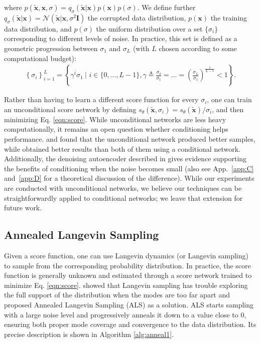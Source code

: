 \documentclass{article} \usepackage{iclr2021_conference_notitle,times}
\theoremstyle{definition}
\theoremstyle{definition}
\begin{document}
where $p(\boldsymbol{\tilde{x}}, \boldsymbol{x}, \sigma) = q_\sigma(\boldsymbol{\tilde{x}} | \boldsymbol{x})p(\boldsymbol{x})p(\sigma)$. We define further  $q_{\sigma}(\boldsymbol{\tilde{x}}|\boldsymbol{x}) = \mathcal{N}(\boldsymbol{\tilde{x}} | {\boldsymbol{x}},\sigma^2 \boldsymbol{I})$ the corrupted data distribution, $p(\boldsymbol{x})$ the training data distribution, and $p(\sigma)$ the uniform distribution over a set $\{\sigma_i\}$ corresponding to different levels of noise.
In practice, this set is defined as a geometric progression between $\sigma_1$ and $\sigma_L$ (with $L$ chosen according to some computational budget):
\begin{align}\label{sigma_set}\left\{\sigma_i\right\}_{i=1}^L = \left\{\gamma^i\sigma_1 ~ \Big| \hspace{4pt} i \in \{0, \dots, L-1\},\gamma \triangleq \frac{\sigma_2}{\sigma_1} = ... = \left( \frac{\sigma_L}{\sigma_1} \right)^{\frac{1}{L-1}} < 1\right\}.
\end{align}


Rather than having to learn a different score function for every $\sigma_i$, one can train an unconditional score network by defining $s_{\theta}(\boldsymbol{\tilde{x}},\sigma_i)=s_{\theta}(\boldsymbol{\tilde{x}})/\sigma_i$, and then minimizing Eq. \ref{eqn:score}. While unconditional networks are less heavy computationally, it remains an open question whether conditioning helps performance. \citet{li2019learning} and \citet{song2020improved} found that the unconditional network produced better samples, while \citet{ho2020denoising} obtained better results than both of them using a conditional network. Additionally, the denoising autoencoder described in \citet{AR-DAE} gives evidence supporting the benefits of conditioning when the noise becomes small (also see App.~\ref{app:C} and~\ref{app:D} for a theoretical discussion of the difference).
While our experiments are conducted with unconditional networks, we believe our techniques can be straightforwardly applied to conditional networks; we leave that extension for future work.

\subsection{Annealed Langevin Sampling}

Given a score function, one can use Langevin dynamics (or Langevin sampling) \citep{welling2011bayesian} to sample from the corresponding probability distribution. In practice, the score function is generally unknown and estimated through a score network trained to minimize Eq. \ref{eqn:score}. \citet{song2019generative} showed that Langevin sampling has trouble exploring the full support of the distribution when the modes are too far apart and proposed Annealed Langevin Sampling (ALS) as a solution. ALS starts sampling with a large noise level and progressively anneals it down to a value close to $0$, ensuring both proper mode coverage and convergence to the data distribution. Its precise description is shown in Algorithm \ref{alg:anneal1}. 
\end{document}
